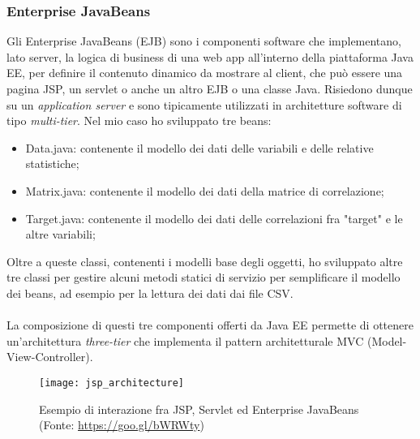 \subsubsection{Enterprise JavaBeans}
Gli Enterprise JavaBeans (EJB) sono i componenti software che implementano, lato server, la logica di business di una \gls{web app} all'interno della piattaforma Java EE, per definire il contenuto dinamico da mostrare al client, che può essere una pagina JSP, un servlet o anche un altro EJB o una classe Java. Risiedono dunque su un \textit{application server} e sono tipicamente utilizzati in architetture software di tipo \textit{multi-tier}.
Nel mio caso ho sviluppato tre beans:
\begin{itemize}
	\item Data.java: contenente il modello dei dati delle variabili e delle relative statistiche;
	\item Matrix.java: contenente il modello dei dati della matrice di correlazione;
	\item Target.java: contenente il modello dei dati delle correlazioni fra "target" e le altre variabili;
\end{itemize}

Oltre a queste classi, contenenti i modelli base degli oggetti, ho sviluppato altre tre classi per gestire alcuni metodi statici di servizio per semplificare il modello dei beans, ad esempio per la lettura dei dati dai file \gls{CSV}.\\\\
La composizione di questi tre componenti offerti da Java EE permette di ottenere un'architettura \textit{three-tier} che implementa il pattern architetturale MVC (Model-View-Controller).
\begin{figure}[!h]
	\centering
	\texttt{[image: jsp\_architecture]}
	\caption{Esempio di interazione fra JSP, Servlet ed Enterprise JavaBeans (Fonte: \href{https://goo.gl/bWRWty}{https://goo.gl/bWRWty})}
\end{figure}

\clearpage
